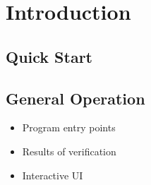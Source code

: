 \section{Introduction}\label{sec:introduction}

\subsection{Quick Start}\label{sec:quick-start}

\subsection{General Operation}

\begin{itemize}
\item Program entry points
\item Results of verification
\item Interactive UI
\end{itemize}
